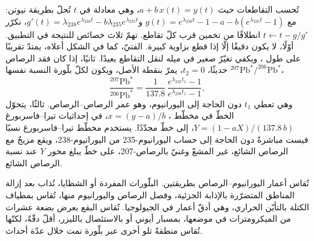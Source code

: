 \begin{omfigure}
\par{}\label{fig:b3:advanced-geochronology:concordia}
\end{omfigure}

تُحسب التقاطعات حيث $a + b\,x(t) = y(t)$، وهي معادلة في $t$ تُحلّ
بطريقة نيوتن: مع $g(t) = e^{\lambda_{238}t} - 1 - a -
b(e^{\lambda_{235}t} - 1)$ و$g'(t) = \lambda_{238}e^{\lambda_{238}t} -
b\lambda_{235}e^{\lambda_{235}t}$، نكرّر $t \leftarrow t - g/g'$ انطلاقًا من تخمين
قرب كلّ تقاطع. تهمّ ثلاث خصائص للنتيجة في التطبيق.
أوّلًا، لا يكون  دقيقًا إلّا إذا قطع 
 بزاوية كبيرة.  الفتيّ، كما في الشكل أعلاه، يمتدّ
تقريبًا على طول ، ويكفي تغيّرٌ صغير في ميله لنقل التقاطع
بعيدًا. ثانيًا، إذا كان فقد الرصاص حديثًا، $t_2 = 0$، يمرّ 
بنقطة الأصل، ويكون لكلّ بلّورة النسبة نفسها
$^{207}\mathrm{Pb}^*/^{206}\mathrm{Pb}^*$،
\[
\frac{^{207}\mathrm{Pb}^*}{^{206}\mathrm{Pb}^*} = \frac{1}{137.8}\,
\frac{e^{\lambda_{235}t_1} - 1}{e^{\lambda_{238}t_1} - 1},
\]
وهي تعطي $t_1$ دون الحاجة إلى اليورانيوم، وهو عمر الرصاص--الرصاص. ثالثًا، يتحوّل الخطّ في مخطّط ،
$x = (y - a)/b$، في إحداثيات تيرا--فاسربورغ
$Y = (1 - aX)/(137.8\,b)$، إلى خطّ مجدّدًا. يستخدم مخطّط تيرا--فاسربورغ نسبًا
قيست مباشرةً دون الحاجة إلى حساب اليورانيوم-235 من اليورانيوم-238، ويقع مزيجٌ
مع الرصاص الشائع، غير المشعّ وغنيّ بالرصاص-207، على خطّ
يبلغ محور $Y$ عند نسبة
الرصاص الشائع.

تُقاس أعمار اليورانيوم--الرصاص بطريقتين. البلّورات المفردة أو الشظايا،
تُذاب بعد إزالة المناطق المتضرّرة بالإذابة الجزئية،
وفصل الرصاص واليورانيوم منها، تُقاس بمطياف الكتلة بالتأيّن الحراري،
وهي أدقّ أعمار في الجيولوجيا. تُقاس البقع بعرض بضعة عشرات
من الميكرومترات في موضعها، بمسبار أيوني أو بالاستئصال بالليزر،
أقلّ دقّةً، لكنّها تُقاس منطقةً تلو أخرى عبر بلّورة نمت خلال
عدّة أحداث.

